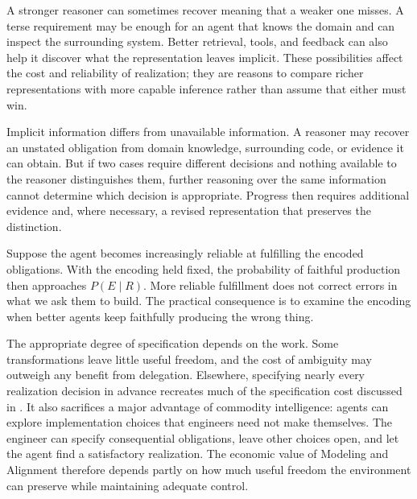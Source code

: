 
A stronger reasoner can sometimes recover meaning that a weaker one misses. A terse requirement may be enough for an agent that knows the domain and can inspect the surrounding system. Better retrieval, tools, and feedback can also help it discover what the representation leaves implicit. These possibilities affect the cost and reliability of realization; they are reasons to compare richer representations with more capable inference rather than assume that either must win.

Implicit information differs from unavailable information. A reasoner may recover an unstated obligation from domain knowledge, surrounding code, or evidence it can obtain. But if two cases require different decisions and nothing available to the reasoner distinguishes them, further reasoning over the same information cannot determine which decision is appropriate. Progress then requires additional evidence and, where necessary, a revised representation that preserves the distinction.


Suppose the agent becomes increasingly reliable at fulfilling the encoded obligations. With the encoding held fixed, the probability of faithful production then approaches \(P(E\mid R)\). More reliable fulfillment does not correct errors in what we ask them to build. The practical consequence is to examine the encoding when better agents keep faithfully producing the wrong thing.


The appropriate degree of specification depends on the work. Some transformations leave little useful freedom, and the cost of ambiguity may outweigh any benefit from delegation. Elsewhere, specifying nearly every realization decision in advance recreates much of the specification cost discussed in . It also sacrifices a major advantage of commodity intelligence: agents can explore implementation choices that engineers need not make themselves. The engineer can specify consequential obligations, leave other choices open, and let the agent find a satisfactory realization. The economic value of Modeling and Alignment therefore depends partly on how much useful freedom the environment can preserve while maintaining adequate control.

